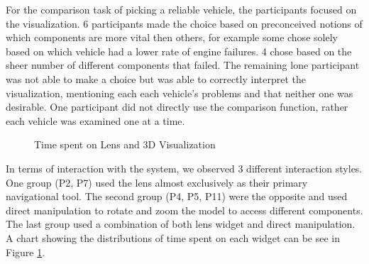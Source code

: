 For the comparison task of picking a reliable vehicle, the participants
focused on the \threed visualization. 6 participants made the choice based on
preconceived notions of which components are more vital then others, for example
some chose solely based on which vehicle had a lower rate of engine failures. 4
chose based on the sheer number of different components that failed. The
remaining lone participant was not able to make a choice but was able to
correctly interpret the visualization, mentioning each each vehicle's problems
and that neither one was desirable. One participant did not directly use the
comparison function, rather each vehicle was examined one at a time.

 

\begin{figure}
\caption{Time spent on Lens and 3D Visualization}
\label{chart:usage}     
\end{figure}
  
   
In terms of interaction with the system, we observed 3 different
interaction styles. One group (P2, P7) used the lens almost exclusively
as their primary navigational tool. The second group (P4, P5, P11) were the
opposite and used direct manipulation to rotate and zoom the \threed model to
access different components. The last group used a combination of both lens
widget and direct manipulation. A chart showing the distributions of time spent
on each widget can be see in Figure \ref{chart:usage}.



